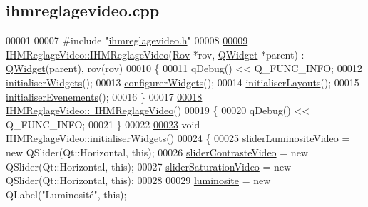 \hypertarget{ihmreglagevideo_8cpp_source}{}\subsection{ihmreglagevideo.\+cpp}
\label{ihmreglagevideo_8cpp_source}

\begin{DoxyCode}
00001 
00007 \textcolor{preprocessor}{#include "\hyperlink{ihmreglagevideo_8h}{ihmreglagevideo.h}"}
00008 
\hyperlink{class_i_h_m_reglage_video_aa057ded6ad29a2d7fd117a8e9336c3ad}{00009} \hyperlink{class_i_h_m_reglage_video_aa057ded6ad29a2d7fd117a8e9336c3ad}{IHMReglageVideo::IHMReglageVideo}(\hyperlink{class_rov}{Rov} *rov, 
      \hyperlink{class_q_widget}{QWidget} *parent) : \hyperlink{class_q_widget}{QWidget}(parent), rov(rov)
00010 \{
00011     qDebug() << Q\_FUNC\_INFO;
00012     \hyperlink{class_i_h_m_reglage_video_ad41172843e79eae9bb64048ec76b81e6}{initialiserWidgets}();
00013     \hyperlink{class_i_h_m_reglage_video_a2e51529e3a822121ae999e13da2180c6}{configurerWidgets}();
00014     \hyperlink{class_i_h_m_reglage_video_a6efcf5e8c7dfd272ecb1398985f7332a}{initialiserLayouts}();
00015     \hyperlink{class_i_h_m_reglage_video_a4576b1b6ccfcabf6b2b39d37db2dd248}{initialiserEvenements}();    
00016 \}
00017 
\hyperlink{class_i_h_m_reglage_video_aaf105e0ca892a751632170a3a083dfec}{00018} \hyperlink{class_i_h_m_reglage_video_aaf105e0ca892a751632170a3a083dfec}{IHMReglageVideo::~IHMReglageVideo}()
00019 \{
00020     qDebug() << Q\_FUNC\_INFO;
00021 \}
00022 
\hyperlink{class_i_h_m_reglage_video_ad41172843e79eae9bb64048ec76b81e6}{00023} \textcolor{keywordtype}{void} \hyperlink{class_i_h_m_reglage_video_ad41172843e79eae9bb64048ec76b81e6}{IHMReglageVideo::initialiserWidgets}()
00024 \{
00025     \hyperlink{class_i_h_m_reglage_video_a333b7f1b3239abd5823e0b0f2857716b}{sliderLuminositeVideo} = \textcolor{keyword}{new} QSlider(Qt::Horizontal, \textcolor{keyword}{this});
00026     \hyperlink{class_i_h_m_reglage_video_a69917b4179132a63efe6c3fb63ba666a}{sliderContrasteVideo} = \textcolor{keyword}{new} QSlider(Qt::Horizontal, \textcolor{keyword}{this});
00027     \hyperlink{class_i_h_m_reglage_video_aba60de0eccec35f165101b10c0cd33df}{sliderSaturationVideo} = \textcolor{keyword}{new} QSlider(Qt::Horizontal, \textcolor{keyword}{this});
00028 
00029     \hyperlink{class_i_h_m_reglage_video_a16b65877af48863d0752e226371952ab}{luminosite} = \textcolor{keyword}{new} QLabel(\textcolor{stringliteral}{"Luminosité"}, \textcolor{keyword}{this});

\end{DoxyCode}
